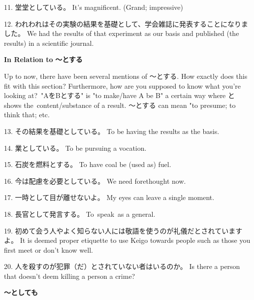 \par{11. 堂堂としている。 \hfill\break
It's magnificent. (Grand; impressive) }

\par{12. われわれはその実験の結果を基礎として、学会雑誌に発表することになりました。 \hfill\break
We had the results of that experiment as our basis and published (the results) in a scientific journal. }

\begin{center}
 \textbf{In Relation to }\textbf{～とする }
\end{center}

\par{ Up to now, there have been several mentions of ～とする. How exactly does this fit with this section? Furthermore, how are you supposed to know what you're looking at? "AをBとする" is "to make\slash have A be B" a certain way where と shows the content\slash substance of a result. ～とする can mean "to presume; to think that; etc. }

\par{13. その結果を基礎としている。 \hfill\break
To be having the results as the basis. }

\par{14. 業としている。 \hfill\break
To be pursuing a vocation. }

\par{15. 石炭を燃料とする。 \hfill\break
To have coal be (used as) fuel. }

\par{16. 今は配慮を必要としている。 \hfill\break
We need forethought now. }

\par{17. 一時として目が離せないよ。 \hfill\break
My eyes can leave a single moment. }

\par{18. 長官として発言する。 \hfill\break
To speak as a general. }

\par{19. 初めて会う人やよく知らない人には敬語を使うのが礼儀だとされていますよ。 \hfill\break
It is deemed proper etiquette to use Keigo towards people such as those you first meet or don't know well. }

\par{20. 人を殺すのが犯罪（だ）とされていない者はいるのか。 \hfill\break
Is there a person that doesn't deem killing a person a crime? }

\begin{center}
\textbf{～としても }
\end{center}

